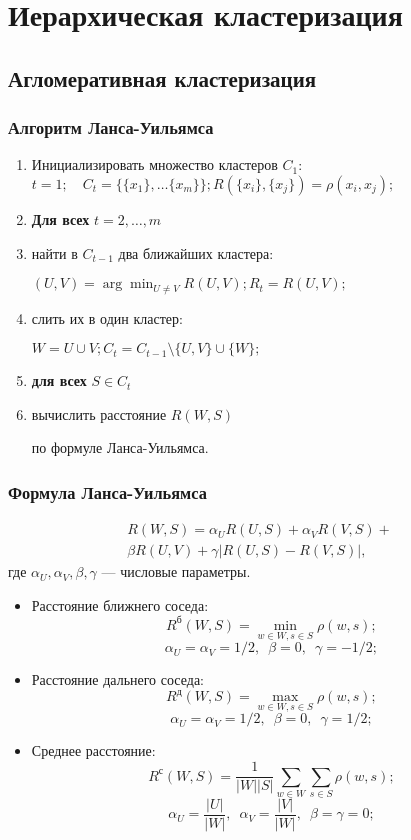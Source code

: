 \documentclass[12pt,pdf,notheorems]{beamer}
\begin{document}
\section[Иерархическая кластеризация]{Иерархическая кластеризация}
\subsection[Агломеративная кластеризация]{Агломеративная кластеризация}

\begin{frame}\frametitle{Алгоритм Ланса-Уильямса}
\begin{enumerate}
	\item Инициализировать множество кластеров $C_1$:
		$t=1; \quad C_t = \{\{x_1\}, \dots \{ x_m\}\}; 
		R(\{x_i\}, \{x_j\})=\rho(x_i, x_j);$
	\item \textbf{Для всех} $t=2, \dots, m$
	\item   \quad найти в $C_{t-1}$ два ближайших кластера: 

		\quad $(U, V) = \arg \min_{U \neq V} R(U, V); R_t=R(U, V);$
	\item   \quad слить их в один кластер: 

		\quad $W=U \cup V; C_t=C_{t-1} \setminus \{U, V\} \cup \{W\};$
	\item   \quad \textbf{для всех} $S \in C_t$
	\item     \qquad вычислить расстояние $R(W,S)$ 

		\qquad по формуле Ланса-Уильямса.
	\end{enumerate}
\end{frame}

\begin{frame}
	\frametitle{Формула Ланса-Уильямса} 
	\begin{multline*}
		R(W, S) = \alpha_U R(U, S) + \alpha_V R(V, S) + \\
		\beta R(U, V) + \gamma | R(U,S) - R(V, S) |,
	\end{multline*}
	где $\alpha_U, \alpha_V, \beta, \gamma$ --- числовые параметры.
\end{frame}

\begin{frame}
\begin{itemize}
	\item Расстояние ближнего соседа:
		$$R^{\text{б}}(W, S) = \min_{w \in W, s \in S} \rho(w, s);$$ $$\alpha_U=\alpha_V=1/2,\enspace \beta=0,\enspace \gamma=-1/2;$$
	\item Расстояние дальнего соседа:
		$$R^{\text{д}}(W, S) = \max_{w \in W, s \in S} \rho(w, s);$$ $$\alpha_U=\alpha_V=1/2,\enspace \beta=0,\enspace \gamma=1/2;$$
	\item Среднее расстояние:
		$$R^{\text{с}}(W, S) = \frac{1}{ |W| |S| } \sum_{w \in W} \sum_{s \in S} \rho(w, s);$$ $$\alpha_U=\frac{|U|}{|W|},\enspace \alpha_V=\frac{|V|}{|W|},\enspace \beta=\gamma=0;$$
\end{itemize}
\end{frame}
\end{document}
